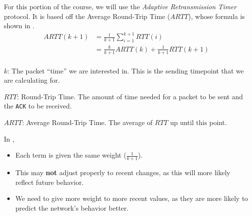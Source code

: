 For this portion of the course, we will use the \emph{Adaptive Retransmission Timer} protocol.
It is based off the Average Round-Trip Time ($ARTT$), whose formula is shown in .
\begin{equation}\label{eq:Average_Round_Trip_Time}
  \begin{aligned}
    ARTT(k+1) &= \frac{1}{k+1} \sum\limits_{i=1}^{k+1} RTT(i) \\
    &= \frac{k}{k+1} ARTT(k) + \frac{1}{k+1}RTT(k+1) \\
  \end{aligned}
\end{equation}
\begin{description}[noitemsep]
\item $k$: The packet ``time'' we are interested in. This is the sending timepoint that we are calculating for.
\item $RTT$: Round-Trip Time. The amount of time needed for a packet to be sent and the \texttt{ACK} to be received.
\item $ARTT$: Average Round-Trip Time. The average of $RTT$ up until this point.
\end{description}

In ,
\begin{itemize}[noitemsep]
\item Each term is given the same weight ($\frac{1}{k+1}$).
\item This may \textbf{not} adjust properly to recent changes, as this will more likely reflect future behavior.
\item We need to give more weight to more recent values, as they are more likely to predict the network's behavior better.
\end{itemize}

